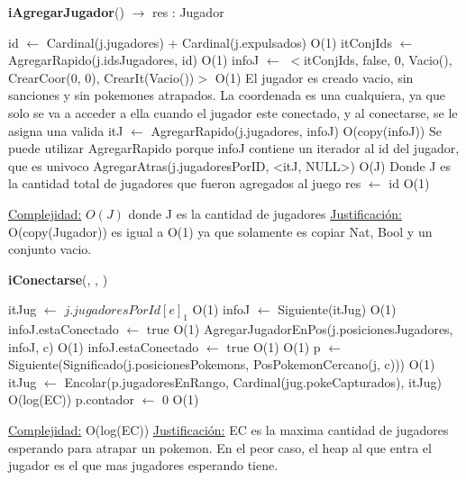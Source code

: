 \begin{algorithm}[H]{\textbf{iAgregarJugador}() $\to$ res : Jugador}
	\begin{algorithmic}
		\State id $\gets$ Cardinal(j.jugadores) + Cardinal(j.expulsados) \Comment O(1)
		\State itConjIds $\gets$ AgregarRapido(j.idsJugadores, id)	\Comment O(1)
		\State infoJ $\gets$ $<$itConjIds, false, 0, Vacio(), CrearCoor(0, 0), CrearIt(Vacio())$>$ \Comment O(1) {El jugador es creado vacio, sin sanciones y sin pokemones atrapados. La coordenada es una cualquiera, ya que solo se va a acceder a ella cuando el jugador este conectado, y al conectarse, se le asigna una valida}
		\State itJ $\gets$ AgregarRapido(j.jugadores, infoJ) \Comment O(copy(infoJ)) {Se puede utilizar AgregarRapido porque infoJ contiene un iterador al id del jugador, que es univoco}
		\State AgregarAtras(j.jugadoresPorID, <itJ, NULL>) \Comment O(J) {Donde J es la cantidad total de jugadores que fueron agregados al juego} %
		\State res $\gets$ id \Comment O(1)
					
		\medskip
		\Statex \underline{Complejidad:} $O(J)$ donde J es la cantidad de jugadores
		\Statex \underline{Justificación:} O(copy(Jugador)) es igual a O(1) ya que solamente es copiar Nat, Bool y un conjunto vacio.
    \end{algorithmic}
\end{algorithm}

\begin{algorithm}[H]{\textbf{iConectarse}(, , )}
	\begin{algorithmic}
		\State itJug $\gets$ $j.jugadoresPorId[e]_{1}$	\Comment O(1)
    \State infoJ $\gets$ Siguiente(itJug) \Comment O(1) 
		\State infoJ.estaConectado $\gets$ true \Comment O(1)
    \State AgregarJugadorEnPos(j.posicionesJugadores, infoJ, c) \Comment O(1)
    \State infoJ.estaConectado $\gets$ true \Comment O(1)
			\Comment O(1)
			\State p $\gets$ Siguiente(Significado(j.posicionesPokemons, PosPokemonCercano(j, c)))	\Comment O(1)
			\State itJug $\gets$ Encolar(p.jugadoresEnRango, Cardinal(jug.pokeCapturados), itJug)	\Comment O(log(EC))
			\State p.contador $\gets$ 0	\Comment O(1)
		\EndIf
	
		\medskip
		\Statex \underline{Complejidad:} O(log(EC))
		\Statex \underline{Justificación:} EC es la maxima cantidad de jugadores esperando para atrapar un pokemon. En el peor caso, el heap al que entra el jugador es el que mas jugadores esperando tiene.
    \end{algorithmic}
\end{algorithm}


